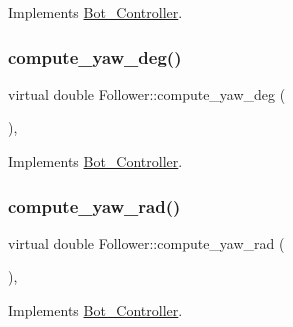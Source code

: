 Implements \hyperlink{class_bot___controller_a836b1e434c1c15ccec0b81313a32aca8}{Bot\+\_\+\+Controller}.

\mbox{\label{class_follower_a300c727aa90274ffa63a2fb9a6403054}} 
\subsubsection{\texorpdfstring{compute\+\_\+yaw\+\_\+deg()}{compute\_yaw\_deg()}}
{\footnotesize\ttfamily virtual double Follower\+::compute\+\_\+yaw\+\_\+deg (\begin{DoxyParamCaption}{ }\end{DoxyParamCaption})\hspace{0.3cm}{\ttfamily [override]}, {\ttfamily [virtual]}}



Implements \hyperlink{class_bot___controller_abda61292c3719a4a5676ddcd0d8311a1}{Bot\+\_\+\+Controller}.

\mbox{\label{class_follower_a09782942c6aeb9c1797931eb42bc9d20}} 
\subsubsection{\texorpdfstring{compute\+\_\+yaw\+\_\+rad()}{compute\_yaw\_rad()}}
{\footnotesize\ttfamily virtual double Follower\+::compute\+\_\+yaw\+\_\+rad (\begin{DoxyParamCaption}{ }\end{DoxyParamCaption})\hspace{0.3cm}{\ttfamily [override]}, {\ttfamily [virtual]}}



Implements \hyperlink{class_bot___controller_a362541183536f955e54234e14f18f3c2}{Bot\+\_\+\+Controller}.

\mbox{\label{class_follower_a8d6f37307eb0693f9ca04d31ccfe75ae}} 
